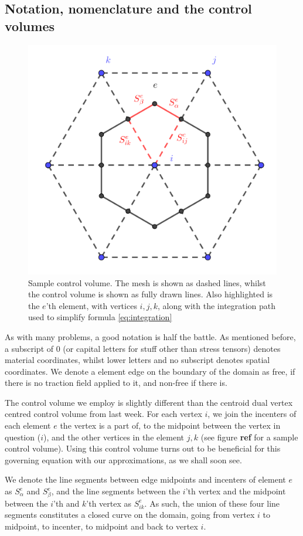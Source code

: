 \documentclass[sigconf]{acmart}
\begin{document}
\subsection{Notation, nomenclature and the control volumes}
\begin{figure}
	\centering
	\includegraphics[width=0.7\linewidth]{CV.png}
	\caption{Sample control volume. The mesh is shown as dashed lines, whilst the control volume is shown as fully drawn lines. Also highlighted is the $ e $'th element, with vertices $ i,j,k $, along with the integration path used to simplify formula \ref{eq:integration}}
	\label{fig:CV}
\end{figure}
As with many problems, a good notation is half the battle. As mentioned before, a subscript of 0 (or capital letters for stuff other than stress tensors) denotes material coordinates, whilst lower letters and no subscript denotes spatial coordinates. We denote a element edge on the boundary of the domain as free, if there is no traction field applied to it, and non-free if there is.

The control volume we employ is slightly different than the centroid dual vertex centred control volume from last week. For each vertex $ i $, we join the incenters of each element $ e $ the vertex is a part of, to the midpoint between the vertex in question ($ i $), and the other vertices in the element $ j,k $ (see figure \textbf{ref} for a sample control volume). Using this control volume turns out to be beneficial for this governing equation with our approximations, as we shall soon see.

We denote the line segments between edge midpoints and incenters of element $ e $ as $ S^e_{\alpha} $ and $ S^e_{\beta} $, and the line segments between the $ i $'th vertex and the midpoint between the $ i $'th and $ k $'th vertex as $ S^e_{ik} $. As such, the union of these four line segments constitutes a closed curve on the domain, going from vertex $ i $ to midpoint, to incenter, to midpoint and back to vertex $ i $.
\end{document}
